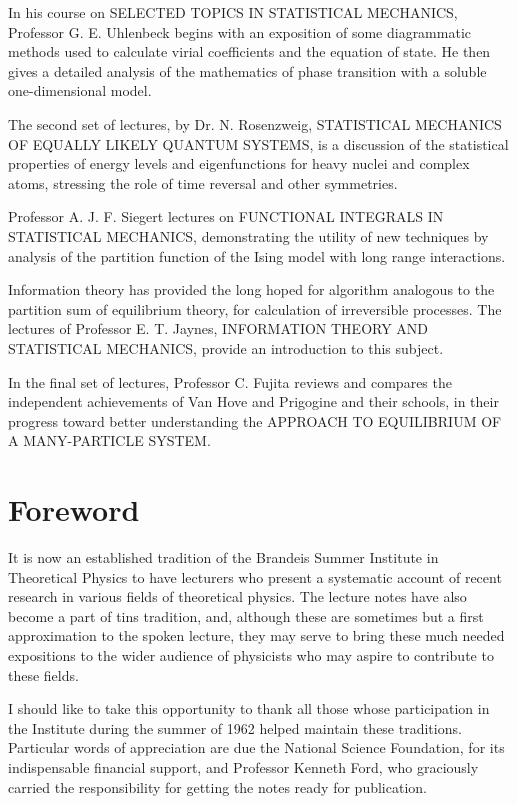 \documentclass[]{article}
\begin{document}
In his course on SELECTED TOPICS IN STATISTICAL MECHANICS, Professor G.
E. Uhlenbeck begins with an exposition of some diagrammatic methods used
to calculate virial coefficients and the equation of state. He then
gives a detailed analysis of the mathematics of phase transition with a
soluble one-dimensional model.

The second set of lectures, by Dr. N. Rosenzweig, STATISTICAL MECHANICS
OF EQUALLY LIKELY QUANTUM SYSTEMS, is a discussion of the statistical
properties of energy levels and eigenfunctions for heavy nuclei and
complex atoms, stressing the role of time reversal and other symmetries.

Professor A. J. F. Siegert lectures on FUNCTIONAL INTEGRALS IN
STATISTICAL MECHANICS, demonstrating the utility of new techniques by
analysis of the partition function of the Ising model with long range
interactions.

Information theory has provided the long hoped for algorithm analogous
to the partition sum of equilibrium theory, for calculation of
irreversible processes. The lectures of Professor E. T. Jaynes,
INFORMATION THEORY AND STATISTICAL MECHANICS, provide an introduction to
this subject.

In the final set of lectures, Professor C. Fujita reviews and compares
the independent achievements of Van Hove and Prigogine and their
schools, in their progress toward better understanding the APPROACH TO
EQUILIBRIUM OF A MANY-PARTICLE SYSTEM.


\pagebreak
\onecolumn

\section*{Foreword}

It is now an established tradition of the Brandeis Summer Institute in
Theoretical Physics to have lecturers who present a systematic account
of recent research in various fields of theoretical physics. The lecture
notes have also become a part of tins tradition, and, although these are
sometimes but a first approximation to the spoken lecture, they may
serve to bring these much needed expositions to the wider audience of
physicists who may aspire to contribute to these fields.

I should like to take this opportunity to thank all those whose
participation in the Institute during the summer of 1962 helped maintain
these traditions. Particular words of appreciation are due the National
Science Foundation, for its indispensable financial support, and
Professor Kenneth Ford, who graciously carried the responsibility for
getting the notes ready for publication.
\end{document}

